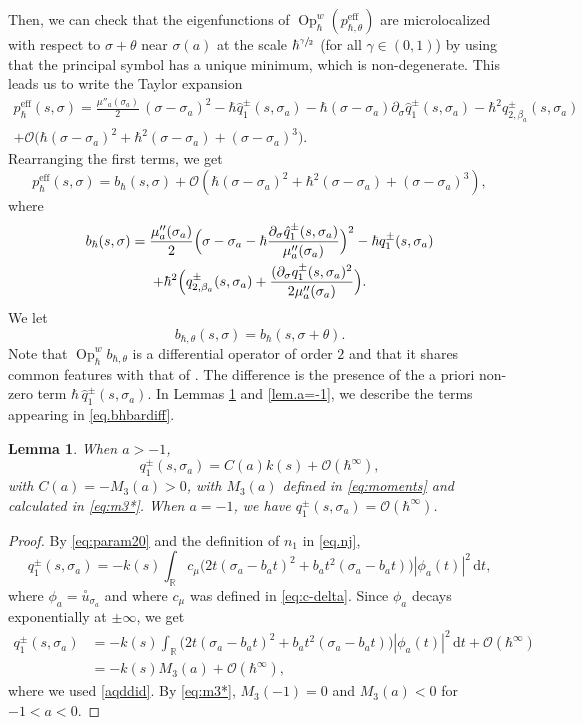 \documentclass[10pt]{amsart}
\newcommand{\rd}{\,\mathrm{d}}
\newcommand{\eff}{\mathrm{eff}}
\DeclareMathOperator{\Op}{Op}
\theoremstyle{plain}
\newtheorem{lemma}[theorem]{Lemma}
\theoremstyle{definition}
\newcommand{\R}{\mathbb{R}}
\begin{document}
Then, we can check that the eigenfunctions of $\Op^w_\hbar(p^{\eff}_{\hbar,\theta})$ are microlocalized with respect to $\sigma+\theta$ near $\sigma(a)$ at the scale $\hbar^{\sfrac{\gamma}{2}}$ (for all $\gamma\in(0,1)$) by using that the principal symbol has a unique minimum, which is non-degenerate. This leads us to write the Taylor expansion
\begin{multline*}
p^{\eff}_{\hbar}(s,\sigma)=\frac{\mu''_a(\sigma_a)}{2}\,(\sigma-\sigma_a)^2-\hbar\hat q_{1}^\pm(s,\sigma_a)-\hbar(\sigma-\sigma_a)\partial_\sigma \hat q_1^\pm(s,\sigma_a)-\hbar^2q_{2,\beta_a}^\pm(s,\sigma_a)\\
+\mathscr{O}\bigl(\hbar(\sigma-\sigma_a)^2+\hbar^2(\sigma-\sigma_a)+(\sigma-\sigma_a)^3\bigr).
\end{multline*}
Rearranging the first terms, we get
\begin{equation}\label{eq.aefftob}
p^{\eff}_\hbar(s,\sigma)=b_\hbar(s,\sigma)
+\mathscr{O}(\hbar(\sigma-\sigma_a)^2+\hbar^2(\sigma-\sigma_a)+(\sigma-\sigma_a)^3),
\end{equation}
where
\begin{multline}\label{eq.bhbardiff}
b_\hbar(s,\sigma)=\frac{\mu''_a(\sigma_a)}{2}\Bigl(\sigma-\sigma_a-\hbar\frac{\partial_\sigma \hat q_1^\pm(s,\sigma_a)}{\mu''_a(\sigma_a)}\Bigr)^2-\hbar q_{1}^\pm(s,\sigma_a)\\
+\hbar^2\Bigl(q_{2,\beta_a}^\pm(s,\sigma_a)+\frac{(\partial_\sigma q_1^\pm(s,\sigma_a)^2}{2\mu''_a(\sigma_a)}\Bigr).
\end{multline}
We let
\[
b_{\hbar,\theta}(s,\sigma)=b_\hbar(s,\sigma+\theta).
\]
Note that $\Op^w_\hbar b_{\hbar,\theta}$ is a differential operator of order $2$ and that it shares common features with that of \cite[(8.10)]{BLTRS21}. The difference is the presence of the a priori non-zero term $\hbar\,\hat q_{1}^\pm(s,\sigma_a)$. In Lemmas \ref{lem.q1=Ck} and \ref{lem.a=-1}, we describe the terms appearing in \eqref{eq.bhbardiff}.

\begin{lemma}\label{lem.q1=Ck}
When $a>-1$,
\[
q_{1}^\pm(s,\sigma_a)=C(a)k(s)+{ \mathscr{O}(\hbar^\infty)},
\]
with $C(a)= -M_3(a)>0$, with $M_3(a)$ defined in \eqref{eq:moments} and calculated in \eqref{eq:m3*}. When $a=-1$, we have $ q_{1}^\pm(s,\sigma_a)=\mathscr{O}(\hbar^\infty)$.
\end{lemma}
\begin{proof}
By \eqref{eq:param20} and the definition of $n_1$ in \eqref{eq.nj},
\[
q_{1}^\pm(s,\sigma_a)= -k(s)\int_\R c_\mu \bigl(2t(\sigma_a-b_a t)^2+b_a t^2(\sigma_a-b_a t)\bigr)|\phi_a(t)|^2\rd t,
\]
where $\phi_a=\overset{\circ}{u}_{\sigma_a}$ and where $c_{\mu}$ was defined in \eqref{eq:c-delta}. Since $\phi_a$ decays exponentially at $\pm\infty$, we get
\begin{align*} q_{1}^\pm(s,\sigma_a)&= -k(s)\int_\R \bigl(2t(\sigma_a-b_a t)^2+b_a t^2(\sigma_a-b_a t)\bigr)|\phi_a(t)|^2\rd t+\mathscr{O}(\hbar^\infty)\\
&=-k(s)M_3(a)+\mathscr{O}(\hbar^\infty),
\end{align*}
where we used \eqref{aqddid}. By \eqref{eq:m3*}, $M_3(-1)=0$ and $M_3(a)<0$ for $-1<a<0$.
\end{proof}
\end{document}

